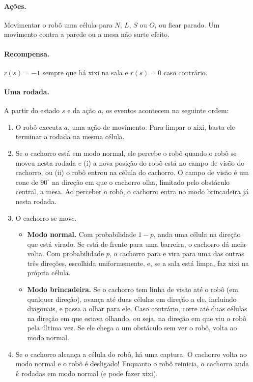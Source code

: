 \documentclass[11pt,a4paper]{article}
\begin{document}
\paragraph{Ações.} Movimentar o robô uma célula para $N$, $L$, $S$ ou $O$, ou ficar parado. Um
movimento contra a parede ou a mesa não surte efeito.

\paragraph{Recompensa.} $r(s) = -1$ sempre que há xixi na sala e $r(s) = 0$ caso contrário.

\paragraph{Uma rodada.} A partir do estado $s$ e da ação $a$, os eventos acontecem na seguinte
ordem:
\begin{enumerate}
  \item O robô executa $a$, uma ação de movimento. Para limpar o xixi, basta ele terminar a rodada
    na mesma célula.
  \item Se o cachorro está em modo normal, ele percebe o robô quando o robô se moveu nesta rodada e
    (i) a nova posição do robô está no campo de visão do cachorro, ou (ii) o robô entrou na célula
    do cachorro. O campo de visão é um cone de $90^\circ$ na direção em que o cachorro olha,
    limitado pelo obstáculo central, a mesa. Ao perceber o robô, o cachorro entra no modo
    brincadeira já nesta rodada.
  \item O cachorro se move.
    \begin{itemize}
      \item \textbf{Modo normal.} Com probabilidade $1-p$, anda uma célula na direção que está
        virado. Se está de frente para uma barreira, o cachorro dá meia-volta. Com probabilidade
        $p$, o cachorro para e vira para uma das outras três direções, escolhida uniformemente, e,
        se a sala está limpa, faz xixi na própria célula.
      \item \textbf{Modo brincadeira.} Se o cachorro tem linha de visão até o robô (em qualquer
        direção), avança até duas células em direção a ele, incluindo diagonais, e passa a olhar
        para ele. Caso contrário, corre até duas células na direção em que estava olhando, ou seja,
        na direção em que viu o robô pela última vez. Se ele chega a um obstáculo sem ver o robô,
        volta ao modo normal.
    \end{itemize}
  \item Se o cachorro alcança a célula do robô, há uma captura. O cachorro volta ao modo normal e o
    robô é desligado! Enquanto o robô reinicia, o cachorro anda $k$ rodadas em modo normal (e pode
    fazer xixi).
\end{enumerate}
\end{document}
